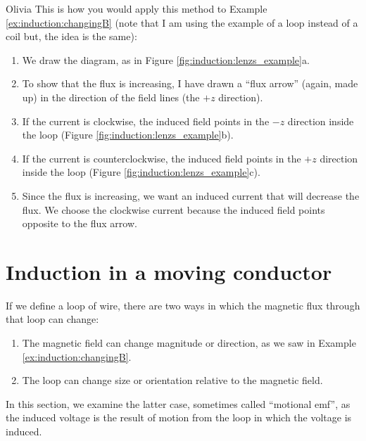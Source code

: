\begin{studentOpinion}{Olivia}
This is how you would apply this method to Example \ref{ex:induction:changingB} (note that I am using the example of a loop instead of a coil but, the idea is the same):
\begin{enumerate}
\item We draw the diagram, as in Figure \ref{fig:induction:lenzs_example}a.  
\item To show that the flux is increasing, I have drawn a ``flux arrow'' (again, made up) in the direction of the field lines (the $+z$ direction).
\item If the current is clockwise, the induced field points in the $-z$ direction inside the loop (Figure \ref{fig:induction:lenzs_example}b).
\item If the current is counterclockwise, the induced field points in the $+z$ direction inside the loop (Figure \ref{fig:induction:lenzs_example}c).
\item Since the flux is increasing, we want an induced current that will decrease the flux. We choose the clockwise current because the induced field points opposite to the flux arrow. 
\end{enumerate}
\end{studentOpinion}


\section{Induction in a moving conductor}
If we define a loop of wire, there are two ways in which the magnetic flux through that loop can change:
\begin{enumerate}
\item The magnetic field can change magnitude or direction, as we saw in Example \ref{ex:induction:changingB}.
\item The loop can change size or orientation relative to the magnetic field.
\end{enumerate}
In this section, we examine the latter case, sometimes called ``motional emf'', as the induced voltage is the result of motion from the loop in which the voltage is induced. 

